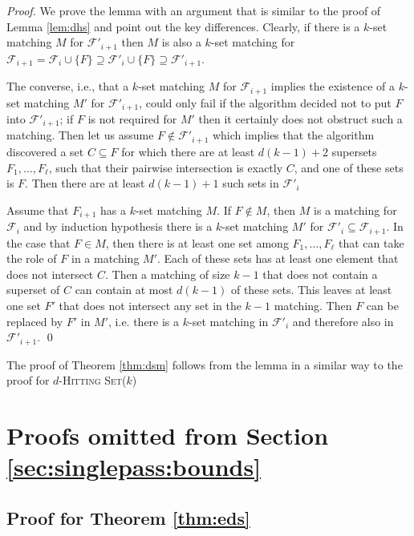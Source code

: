 \documentclass[draft,a4paper]{llncs}
\newcommand{\F}{\ensuremath{\mathcal{F}}\xspace}
\newcommand{\dHSk}{$d$-\textsc{Hitting Set($k$)}\xspace}
\begin{document}
\begin{proof}
 We prove the lemma with an argument that is similar to the proof of Lemma \ref{lem:dhs} and point out the key differences. 
 Clearly, if there is a $k$-set matching $M$ for $\F'_{i+1}$ then $M$ is also a $k$-set matching for $\F_{i+1} = \F_i \cup \{F\} \supseteq \F'_i \cup \{F\} \supseteq \F'_{i+1}$.
 
 The converse, i.e., that a $k$-set matching $M$ for $\F_{i+1}$ implies the existence of a $k$-set matching $M'$ for $\F'_{i+1}$, could only fail if the algorithm decided not to put $F$ into $\F'_{i+1}$;
 if $F$ is not required for $M'$ then it certainly does not obstruct such a matching. 
 Then let us assume $F \notin \F'_{i+1}$ which implies that the algorithm discovered a set $C \subseteq F$ for which there are
 at least $d(k-1)+2$ supersets $F_1, \ldots, F_\ell$, such that their pairwise intersection is exactly $C$, and one of these sets is $F$.
 Then there are at least $d(k-1)+1$ such sets in $\F'_i$
 
 Assume that $F_{i+1}$ has a $k$-set matching $M$. If $F \notin M$, then $M$ is a matching for $\F_i$ and by induction hypothesis there is a $k$-set matching $M'$ for $\F'_{i} \subseteq \F_{i+1}$. In the case that $F \in M$, then there is at least one set among $F_1, \ldots, F_\ell$ that can take the role of $F$ in a matching $M'$. Each of these sets has at least one element that does not intersect $C$. Then a matching of size $k-1$ that does not contain a superset of $C$ can contain at most $d(k-1)$ of these sets. This leaves at least one set $F'$ that does not intersect any set in the $k-1$ matching. Then $F$ can be replaced by $F'$ in $M'$, i.e. there is a $k$-set matching in $\F'_i$ and therefore also in $\F'_{i+1}$. \qed \end{proof}
 
 The proof of Theorem \ref{thm:dsm} follows from the lemma in a similar way to the proof for \dHSk

\section{Proofs omitted from Section \ref{sec:singlepass:bounds}}
\subsection{Proof for Theorem \ref{thm:eds}}
\end{document}
